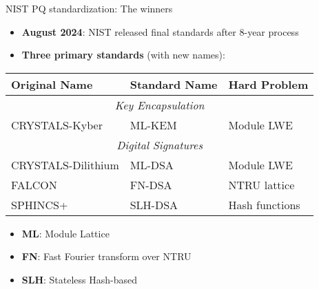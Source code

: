 \documentclass[aspectratio=169, lualatex, handout]{beamer}
\begin{document}
\begin{frame}{NIST PQ standardization: The winners}
	\begin{itemize}
		\item \textbf{August 2024}: NIST released final standards after 8-year process
		\item \textbf{Three primary standards} (with new names):
	\end{itemize}

	\begin{center}
		\begin{tabular}{|l|l|l|}
			\hline
			\textbf{Original Name} & \textbf{Standard Name} & \textbf{Hard Problem} \\
			\hline
			\hline
			\multicolumn{3}{|c|}{\textit{Key Encapsulation}}                        \\
			\hline
			CRYSTALS-Kyber         & ML-KEM                 & Module LWE            \\
			\hline
			\hline
			\multicolumn{3}{|c|}{\textit{Digital Signatures}}                       \\
			\hline
			CRYSTALS-Dilithium     & ML-DSA                 & Module LWE            \\
			FALCON                 & FN-DSA                 & NTRU lattice          \\
			SPHINCS+               & SLH-DSA                & Hash functions        \\
			\hline
		\end{tabular}
	\end{center}

	\begin{itemize}
		\item \textbf{ML}: Module Lattice
		\item \textbf{FN}: Fast Fourier transform over NTRU
		\item \textbf{SLH}: Stateless Hash-based
	\end{itemize}
\end{frame}
\end{document}
